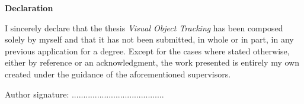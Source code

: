 \thispagestyle{plain}

\mbox{}
\vfill

\large
\textbf{Declaration}
\vspace*{1cm}

\normalsize
I sincerely declare that the thesis \textit{Visual Object Tracking} has been composed solely by myself and that it has not been submitted, in whole or in part, in any previous application for a degree. Except for the cases where stated otherwise, either by reference or an acknowledgment, the work presented is entirely my own created under the guidance of the aforementioned supervisors.

\vspace*{1.2cm}

\begin{flushright}
    Author signature: \hspace*{1.5cm} ........................................
\end{flushright}